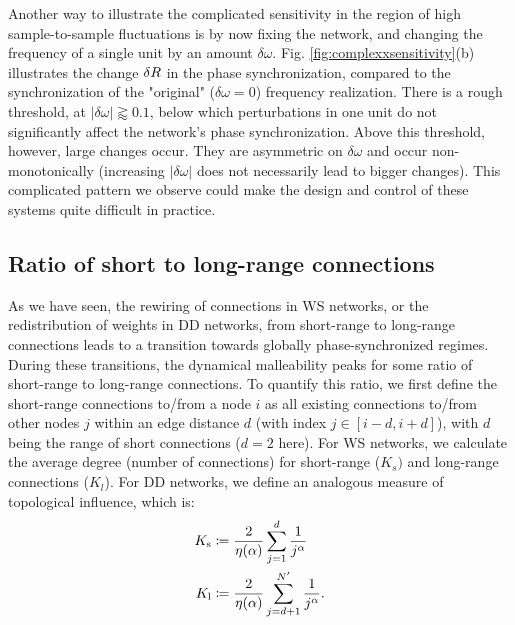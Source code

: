 Another way to illustrate the complicated sensitivity in the region of high sample-to-sample fluctuations is by now fixing the network, and changing the frequency of a single unit by an amount $\delta \omega$. Fig. \ref{fig:complexxsensitivity}(b) illustrates the change $\delta R$ in the phase synchronization, compared to the synchronization of the "original" ($\delta \omega = 0$) frequency realization. There is a rough threshold, at $| \delta \omega | \gtrapprox 0.1$, below which perturbations in one unit do not significantly affect the network's phase synchronization. Above this threshold, however, large changes occur. They are asymmetric on $\delta\omega$ and occur non-monotonically (increasing $|\delta\omega|$ does not necessarily lead to bigger changes). This complicated pattern we observe could make the design and control of these systems quite difficult in practice.

\subsection{Ratio of short to long-range connections}
As we have seen, the rewiring of connections in WS networks, or the redistribution of weights in DD networks, from short-range to long-range connections leads to a transition towards globally phase-synchronized regimes. During these transitions, the dynamical malleability peaks for some ratio of short-range to long-range connections. To quantify this ratio, we first define the short-range connections to/from a node $i$ as all existing connections to/from other nodes $j$ within an edge distance $d$ (with index $j \in [i-d, i+d]$), with $d$ being the range of short connections ($d = 2$ here). For WS networks, we calculate the average degree (number of connections) for short-range ($K_s)$ and long-range connections ($K_l$). For DD networks, we define an analogous measure of topological influence, which is:
%
\begin{align}
    K_\mathrm{s} & \coloneqq \frac{2}{\eta(\alpha)} \sum\limits_{j=1}^{d} \frac{1}{j^\alpha} \\
    K_\mathrm{l} & \coloneqq \frac{2}{\eta(\alpha)} \sum\limits_{j=d+1}^{N^\prime} \frac{1}{j^\alpha} .
\end{align}

